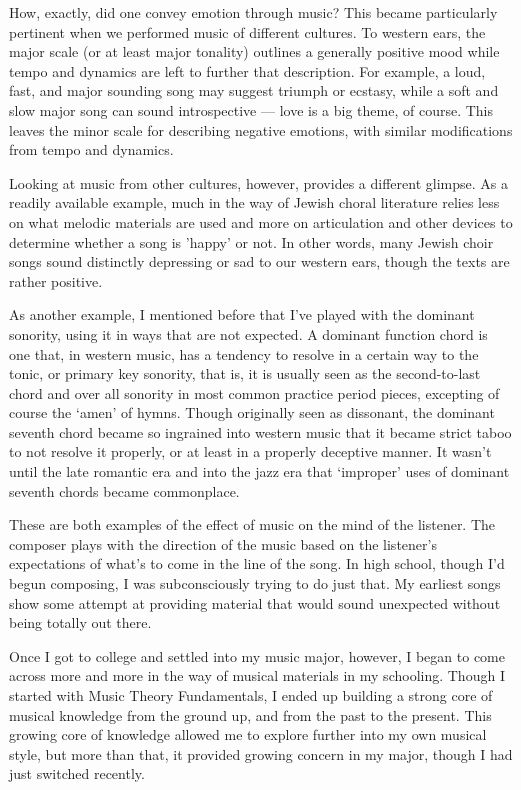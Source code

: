 How, exactly, did one convey emotion through music? This became particularly pertinent when we performed music of different cultures. To western ears, the major scale (or at least major tonality) outlines a generally positive mood while tempo and dynamics are left to further that description. For example, a loud, fast, and major sounding song may suggest triumph or ecstasy, while a soft and slow major song can sound introspective --- love is a big theme, of course. This leaves the minor scale for describing negative emotions, with similar modifications from tempo and dynamics.

Looking at music from other cultures, however, provides a different glimpse. As a readily available example, much in the way of Jewish choral literature relies less on what melodic materials are used and more on articulation and other devices to determine whether a song is 'happy' or not. In other words, many Jewish choir songs sound distinctly depressing or sad to our western ears, though the texts are rather positive.

As another example, I mentioned before that I've played with the dominant sonority, using it in ways that are not expected. A dominant function chord is one that, in western music, has a tendency to resolve in a certain way to the tonic, or primary key sonority, that is, it is usually seen as the second-to-last chord and over all sonority in most common practice period pieces, excepting of course the `amen' of hymns. Though originally seen as dissonant, the dominant seventh chord became so ingrained into western music that it became strict taboo to not resolve it properly, or at least in a properly deceptive manner. It wasn't until the late romantic era and into the jazz era that `improper' uses of dominant seventh chords became commonplace.

These are both examples of the effect of music on the mind of the listener. The composer plays with the direction of the music based on the listener's expectations of what's to come in the line of the song. In high school, though I'd begun composing, I was subconsciously trying to do just that. My earliest songs show some attempt at providing material that would sound unexpected without being totally out there.

Once I got to college and settled into my music major, however, I began to come across more and more in the way of musical materials in my schooling. Though I started with Music Theory Fundamentals, I ended up building a strong core of musical knowledge from the ground up, and from the past to the present. This growing core of knowledge allowed me to explore further into my own musical style, but more than that, it provided growing concern in my major, though I had just switched recently.

